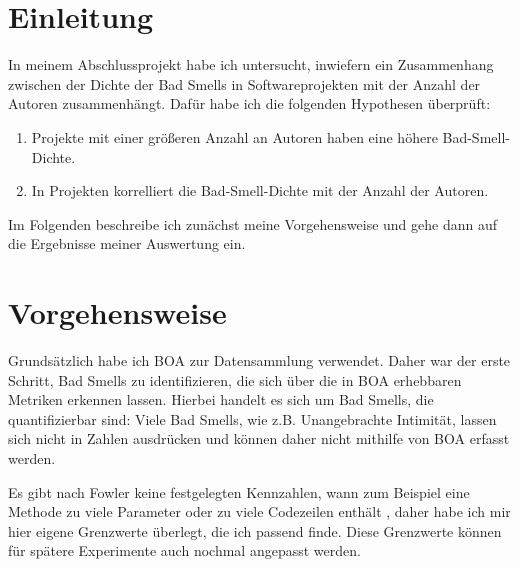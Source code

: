\documentclass[12pt]{article}
\date{}
\begin{document}
\section{Einleitung}
In meinem Abschlussprojekt habe ich untersucht, inwiefern ein Zusammenhang zwischen der Dichte der Bad Smells in Softwareprojekten mit der Anzahl der Autoren zusammenhängt.
Dafür habe ich die folgenden Hypothesen überprüft:
\begin{enumerate}
	\item Projekte mit einer größeren Anzahl an Autoren haben eine höhere Bad-Smell-Dichte.
	\item In Projekten korrelliert die Bad-Smell-Dichte mit der Anzahl der Autoren.
\end{enumerate}

Im Folgenden beschreibe ich zunächst meine Vorgehensweise und gehe dann auf die Ergebnisse meiner Auswertung ein.

\section{Vorgehensweise}
Grundsätzlich habe ich BOA \cite{boa} zur Datensammlung verwendet.
Daher war der erste Schritt, Bad Smells zu identifizieren, die sich über die in BOA erhebbaren Metriken erkennen lassen.
Hierbei handelt es sich um Bad Smells, die quantifizierbar sind:
Viele Bad Smells, wie z.B. Unangebrachte Intimität, lassen sich nicht in Zahlen ausdrücken und können daher nicht mithilfe von BOA erfasst werden.

Es gibt nach Fowler keine festgelegten Kennzahlen, wann zum Beispiel eine Methode zu viele Parameter oder zu viele Codezeilen enthält \cite{fowler2018refactoring}, daher habe ich mir hier eigene Grenzwerte überlegt, die ich passend finde.
Diese Grenzwerte können für spätere Experimente auch nochmal angepasst werden.
\end{document}
